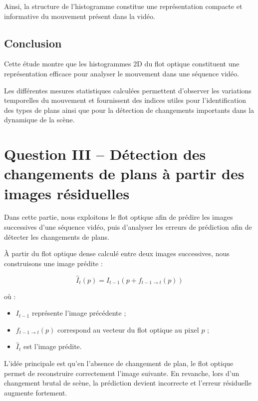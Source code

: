 \documentclass[11pt,a4paper]{article}
\begin{document}
    Ainsi, la structure de l’histogramme constitue une représentation compacte et informative du mouvement présent dans la vidéo.
    
    \subsection*{Conclusion}
    
    Cette étude montre que les histogrammes 2D du flot optique constituent une représentation efficace pour analyser le mouvement dans une séquence vidéo.
    
    Les différentes mesures statistiques calculées permettent d’observer les variations temporelles du mouvement et fournissent des indices utiles pour l’identification des types de plans ainsi que pour la détection de changements importants dans la dynamique de la scène.
        

    \section*{Question III -- Détection des changements de plans à partir des images résiduelles}
    
    Dans cette partie, nous exploitons le flot optique afin de prédire les images successives d’une séquence vidéo, puis d’analyser les erreurs de prédiction afin de détecter les changements de plans.
    
    \vspace{0.3cm}
    
    À partir du flot optique dense calculé entre deux images successives, nous construisons une image prédite :
    
    \[
    \hat{I}_t(p)=I_{t-1}(p+f_{t-1\rightarrow t}(p))
    \]
    
    où :
    \begin{itemize}
        \item $I_{t-1}$ représente l’image précédente ;
        \item $f_{t-1\rightarrow t}(p)$ correspond au vecteur du flot optique au pixel $p$ ;
        \item $\hat{I}_t$ est l’image prédite.
    \end{itemize}
    
    L’idée principale est qu’en l’absence de changement de plan, le flot optique permet de reconstruire correctement l’image suivante.  
    En revanche, lors d’un changement brutal de scène, la prédiction devient incorrecte et l’erreur résiduelle augmente fortement.
    
\end{document}
